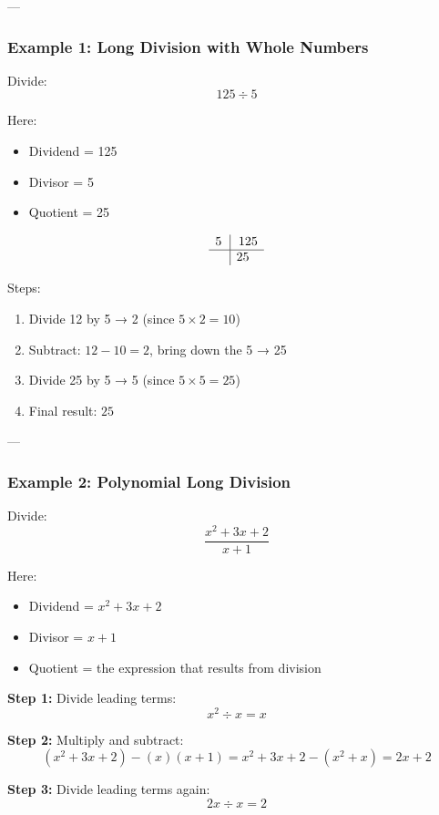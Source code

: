 \documentclass[11pt]{article}
\begin{document}
---

\subsubsection*{Example 1: Long Division with Whole Numbers}

Divide:
\[
125 \div 5
\]

Here:
\begin{itemize}
  \item Dividend = 125
  \item Divisor = 5
  \item Quotient = 25
\end{itemize}

\[
\begin{array}{r|l}
5\, &\,125 \\
\hline
& 25
\end{array}
\]

Steps:
\begin{enumerate}
  \item Divide 12 by 5 → 2 (since \( 5 \times 2 = 10 \))
  \item Subtract: \( 12 - 10 = 2 \), bring down the 5 → 25
  \item Divide 25 by 5 → 5 (since \( 5 \times 5 = 25 \))
  \item Final result: \( 25 \)
\end{enumerate}

---

\subsubsection*{Example 2: Polynomial Long Division}

Divide:
\[
\frac{x^2 + 3x + 2}{x + 1}
\]

Here:
\begin{itemize}
  \item Dividend = \( x^2 + 3x + 2 \)
  \item Divisor = \( x + 1 \)
  \item Quotient = the expression that results from division
\end{itemize}

\textbf{Step 1:} Divide leading terms:
\[
x^2 \div x = x
\]

\textbf{Step 2:} Multiply and subtract:
\[
(x^2 + 3x + 2) - (x)(x + 1) = x^2 + 3x + 2 - (x^2 + x) = 2x + 2
\]

\textbf{Step 3:} Divide leading terms again:
\[
2x \div x = 2
\]
\end{document}

